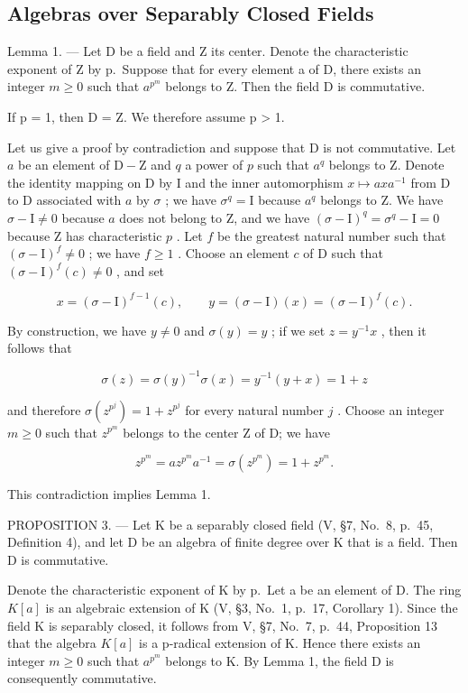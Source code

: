 \subsection{Algebras over Separably Closed Fields}

Lemma 1. --- Let D be a field and Z its center. Denote the characteristic exponent of Z by p.~Suppose that for every element a of D, there exists an integer \(m \geqslant 0\) such that \(a^{p^{m}}\) belongs to Z. Then the field D is commutative.

If p = 1, then D = Z. We therefore assume p \textgreater{} 1.

Let us give a proof by contradiction and suppose that D is not commutative. Let \(a\) be an element of \(\mathrm{D} - \mathrm{Z}\) and \(q\) a power of \(p\) such that \(a^q\) belongs to Z. Denote the identity mapping on D by I and the inner automorphism \(x \mapsto axa^{-1}\) from D to D associated with \(a\) by \(\sigma\) ; we have \(\sigma^q = \mathrm{I}\) because \(a^q\) belongs to Z. We have \(\sigma - \mathrm{I} \neq 0\) because \(a\) does not belong to Z, and we have \((\sigma - \mathrm{I})^q = \sigma^q - \mathrm{I} = 0\) because Z has characteristic \(p\) . Let \(f\) be the greatest natural number such that \((\sigma - \mathrm{I})^f \neq 0\) ; we have \(f \geqslant 1\) . Choose an element \(c\) of D such that \((\sigma - \mathrm{I})^f(c) \neq 0\) , and set

\[
x = (\sigma - \mathrm{I}) ^ {f - 1} (c), \qquad y = (\sigma - \mathrm{I}) (x) = (\sigma - \mathrm{I}) ^ {f} (c).
\]

By construction, we have \(y \neq 0\) and \(\sigma(y) = y\) ; if we set \(z = y^{-1}x\) , then it follows that

\[
\sigma (z) = \sigma (y) ^ {- 1} \sigma (x) = y ^ {- 1} (y + x) = 1 + z
\]

and therefore \(\sigma(z^{p^j}) = 1 + z^{p^j}\) for every natural number \(j\) . Choose an integer \(m \geqslant 0\) such that \(z^{p^m}\) belongs to the center Z of D; we have

\[
z ^ {p ^ {m}} = a z ^ {p ^ {m}} a ^ {- 1} = \sigma (z ^ {p ^ {m}}) = 1 + z ^ {p ^ {m}}.
\]

This contradiction implies Lemma 1.

PROPOSITION 3. --- Let K be a separably closed field (V, §7, No.~8, p.~45, Definition 4), and let D be an algebra of finite degree over K that is a field. Then D is commutative.

Denote the characteristic exponent of K by p.~Let a be an element of D. The ring \(K[a]\) is an algebraic extension of K (V, §3, No.~1, p.~17, Corollary 1). Since the field K is separably closed, it follows from V, §7, No.~7, p.~44, Proposition 13 that the algebra \(K[a]\) is a p-radical extension of K. Hence there exists an integer \(m \geqslant 0\) such that \(a^{p^{m}}\) belongs to K. By Lemma 1, the field D is consequently commutative.

